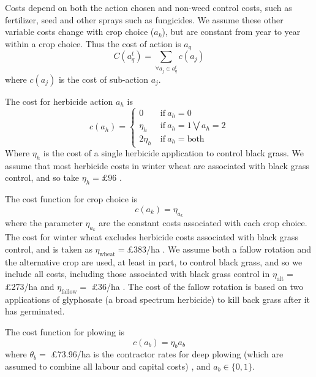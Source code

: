\documentclass[12pt, a4paper]{article}
\begin{document}
Costs depend on both the action chosen and non-weed control costs, such as fertilizer, seed and other sprays such as fungicides. We assume these other variable costs change with crop choice ($a_k$), but are constant from year to year within a crop choice. Thus the cost of action is $a_q$  
\begin{equation}
	C(a_q^t) = \sum_{\forall a_j \in a_q^t} c(a_j)
\end{equation}
where $c(a_j)$ is the cost of sub-action $a_j$. 

The cost for herbicide action $a_h$ is  
\begin{equation}\label{eq:herb_cost}
	c(a_h) = \begin{cases}
		0~&\text{if}~a_h = 0\\
		\eta_h~&\text{if}~a_h = 1 \bigvee a_h = 2 \\
		2\eta_h~&\text{if}~a_h = \text{both}
	\end{cases}
\end{equation}
Where $\eta_h$ is the cost of a single herbicide application to control black grass. We assume that most herbicide costs in winter wheat are associated with black grass control, and so take $\eta_h = \pounds 96$ \citep[pp.~9]{Nix2016}. 

The cost function for crop choice is 
\begin{equation}\label{eq:crop_cost}
	c(a_k) = \eta_{a_k}
\end{equation}   
where the parameter $\eta_{a_k}$ are the constant costs associated with each crop choice. The cost for winter wheat excludes herbicide costs associated with black grass control, and is taken as $\eta_\text{wheat} = $\pounds 383/ha \citep[pp.~9]{Nix2016}. We assume both a fallow rotation and the alternative crop are used, at least in part, to control black grass, and so we include all costs, including those associated with black grass control in $\eta_\text{alt} = $\pounds 273/ha \citep[pp.~12]{Nix2016} and $\eta_\text{fallow} = $ \pounds 36/ha \citep[pp.~202~and~284]{Nix2016}. The cost of the fallow rotation is based on two applications of glyphosate (a broad spectrum herbicide) to kill back grass after it has germinated.       

The cost function for plowing is 
\begin{equation}\label{eq:plow_cost}
	c(a_b) = \eta_b a_b 
\end{equation}
where $\theta_b = $ \pounds 73.96/ha is the contractor rates for deep plowing (which are assumed to combine all labour and capital costs) \citep[pp.~202]{Nix2016}, and $a_b \in \{0, 1\}$. 
\end{document}
